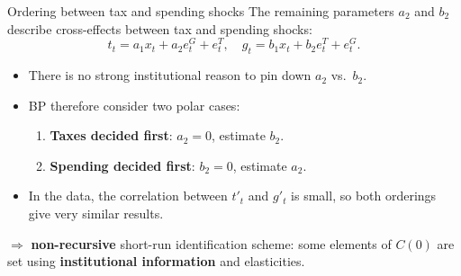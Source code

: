 \documentclass{beamer}
\begin{document}
\begin{frame}{Ordering between tax and spending shocks}
\small
The remaining parameters $a_2$ and $b_2$ describe cross-effects
between tax and spending shocks:
\[
t_t = a_1 x_t + a_2 e^G_t + e^T_t, \quad
g_t = b_1 x_t + b_2 e^T_t + e^G_t.
\]

\begin{itemize}
  \item There is no strong institutional reason to pin down $a_2$ vs.\ $b_2$.
  \item BP therefore consider two polar cases:
  \begin{enumerate}
    \item \textbf{Taxes decided first}: $a_2 = 0$, estimate $b_2$.
    \item \textbf{Spending decided first}: $b_2 = 0$, estimate $a_2$.
  \end{enumerate}
  \item In the data, the correlation between $t'_t$ and $g'_t$ is small, so both orderings give very similar results.
\end{itemize}

\medskip
$\Longrightarrow$ \textbf{non-recursive} short-run identification scheme: some elements of $C(0)$ are set using \textbf{institutional information} and elasticities.
\end{frame}
\end{document}
